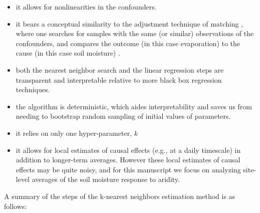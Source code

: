 \begin{itemize}

\item it allows for nonlinearities in the confounders.
\item it bears a conceptual similarity to the adjustment technique of
  matching \cite{stuart2010matching}, where one searches for samples
  with the same (or similar) observations of the confounders, and
  compares the outcome (in this case evaporation) to the cause (in
  this case soil moisture) \cite{shalizi2013}.
\item both the nearest neighbor search and the linear regression steps
  are transparent and interpretable relative to more black box
  regression techniques.
\item the algorithm is deterministic, which aides interpretability and
  saves us from needing to bootstrap random sampling of initial values
  of parameters.
\item it relies on only one hyper-parameter, $k$
\item it allows for local estimates of causal effects (e.g., at a
  daily timescale) in addition to longer-term averages. However these
  local estimates of causal effects may be quite noisy, and for this
  manuscript we focus on analyzing site-level averages of the soil
  moisture response to aridity.
\end{itemize}


A summary of the steps of the k-nearest neighbors estimation method is
as follows:

